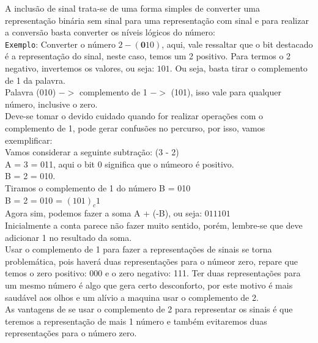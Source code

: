 \documentclass[12pt, onecolumn]{article}
\begin{document}
	A inclusão de sinal trata-se de uma forma simples de converter uma 
	representação binária sem sinal para uma representação com sinal e 
	para realizar a conversão basta converter os níveis lógicos do número:\\
	\newline
	\texttt{Exemplo}: Converter o número $2 - (\textbf{0}10)$, aqui, 
	vale ressaltar que o bit destacado é a representação do sinal, 
	neste caso, temos um 2 positivo. Para termos o 2 negativo, invertemos os 
	valores, ou seja: 
	$101$. Ou seja, basta tirar o complemento de 1 da palavra. \\
	\newline
	Palavra (010) $->$ complemento de 1 $->$ (101), isso vale para 
	qualquer número, inclusive o zero.\\
	\newline
	Deve-se tomar o devido cuidado quando for realizar operações com o 
	complemento de 1, pode gerar confusões no percurso, por isso, vamos
	exemplificar: \\
	\newline
	Vamos considerar a seguinte subtração: (3 - 2) \\
	\newline
	A = 3 = 011, aqui o bit 0 significa que o númeoro é positivo.\\
	B = 2 = 010. \\
	Tiramos o complemento de 1 do número B = 010\\
	B = 2 = 010 = $(101)_c1$ \\
	\newline
	Agora sim, podemos fazer a soma A + (-B), ou seja: 
	$
	011  
	101
	$ \\
	Inicialmente a conta parece não fazer muito sentido, porém, 
	lembre-se que deve adicionar 1 no resultado da soma.\\
	\newline	
	Usar o complemento de 1 para fazer a representações de sinais
	se torna problemática, pois haverá duas representações para o
	númeor zero, repare que temos o zero positivo: 000 e o
	zero negativo: 111. Ter duas representações para um mesmo
	número é algo que gera certo desconforto, por este motivo
	é mais saudável aos olhos e um alívio a maquina usar o 
	complemento de 2. \\
	\newline
	As vantagens de se usar o complemento de 2 para representar os
	sinais é que teremos a representação de mais 1 número e também
	evitaremos duas representações para o número zero.\\
\end{document}
